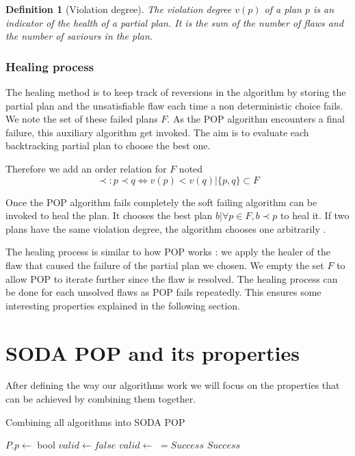 \documentclass[]{article}
\newtheorem{definition}{Definition}
\begin{document}
\begin{definition}[Violation degree]

The violation degree \(v(p)\) of a plan \(p\) is an indicator of the
health of a partial plan. It is the sum of the number of flaws and the
number of saviours in the plan.

\end{definition}

\subsubsection{Healing process}\label{healing-process}

The healing method is to keep track of reversions in the algorithm by
storing the partial plan and the unsatisfiable flaw each time a non
deterministic choice fails. We note the set of these failed plans \(F\).
As the POP algorithm encounters a final failure, this auxiliary
algorithm get invoked. The aim is to evaluate each backtracking partial
plan to choose the best one.

Therefore we add an order relation for \(F\) noted
\[\prec : p \prec q \iff v(p) < v(q) | \{p, q\} \subset F\]

Once the POP algorithm fails completely the soft failing algorithm can
be invoked to heal the plan. It chooses the best plan
\(b | \forall p \in F, b \prec p\) to heal it. If two plans have the
same violation degree, the algorithm chooses one arbitrarily .

The healing process is similar to how POP works : we apply the healer of
the flaw that caused the failure of the partial plan we chosen. We empty
the set \(F\) to allow POP to iterate further since the flaw is
resolved. The healing process can be done for each unsolved flaws as POP
fails repeatedly. This ensures some interesting properties explained in
the following section.

\section{SODA POP and its properties}\label{soda-pop-and-its-properties}

After defining the way our algorithms work we will focus on the
properties that can be achieved by combining them together.

\begin{algorithm}\caption{Combining all algorithms into SODA POP}\label{soda}\begin{algorithmic}

 \State \(P.p \gets\)
 \State {} \State bool
\(valid \gets false\)  \State \(valid \gets\)
 \(= Success\)  \State {}
\State \Return \(Success\) \EndIf
        \State {} \EndWhile
\EndFunction

\end{algorithmic}\end{algorithm}
\end{document}
